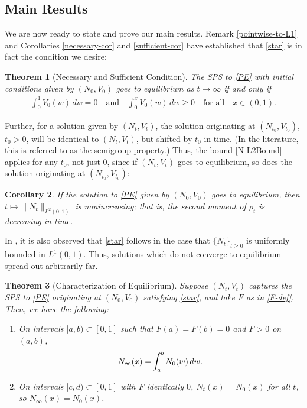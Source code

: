 \documentclass[11pt]{article}
\newtheorem{thm}{Theorem}[section]
\newtheorem{cor}[thm]{Corollary}
\numberwithin{equation}{section}
\def\Xint#1{\mathchoice
{\XXint\displaystyle\textstyle{#1}}%
{\XXint\textstyle\scriptstyle{#1}}%
{\XXint\scriptstyle\scriptscriptstyle{#1}}%
{\XXint\scriptscriptstyle\scriptscriptstyle{#1}}%
   \!\int}
\def\XXint#1#2#3{{\setbox0=\hbox{$#1{#2#3}{\int}$}
\vcenter{\hbox{$#2#3$}}\kern-.5\wd0}}
\def\dashint{\Xint-}
\begin{document}
\subsection{Main Results}
    We are now ready to state and prove our main results. Remark \ref{pointwise-to-L1} and Corollaries \ref{necessary-cor} and \ref{sufficient-cor} have established that \eqref{star} is in fact the condition we desire: 
    \begin{thm}[Necessary and Sufficient Condition]\label{necessary-and-sufficient}
        The SPS to \eqref{PE}  with initial conditions given by $(N_0, V_0)$ goes to equilibrium as $t\to\infty$ if and only if
        \begin{align*}\label{star2}\tag{$\bigstar$}
            \int_0^1 V_0(w) \, dw=0 \quad\text{and}\quad \int_0^x V_0(w) \, dw\geq0 \quad\text{for all}\quad x\in(0,1). 
        \end{align*}        
    \end{thm}
    Further, for a solution given by $(N_t,V_t)$, the solution originating at $(N_{t_0},V_{t_0})$, $t_0>0$, will be identical to $(N_t,V_t)$, but shifted by $t_0$ in time. (In the literature, this is referred to as the semigroup property.) Thus, the bound \eqref{N-L2Bound} applies for any $t_0$, not just $0$, since if $(N_t,V_t)$ goes to equilibrium, so does the solution originating at $(N_{t_0},V_{t_0})$:
    \begin{cor}
        If the solution to \eqref{PE} given by $(N_0,V_0)$ goes to equilibrium, then $t\mapsto\|N_t\|_{L^2(0,1)}$ is nonincreasing; that is, the second moment of $\rho_t$ is decreasing in time. 
    \end{cor}
    In \cite{Hynd-Tudorascu}, it is also observed that \eqref{star} follows in the case that $\{N_t\}_{t\geq0}$ is uniformly bounded in $L^1(0,1)$. Thus, solutions which do not converge to equilibrium spread out arbitrarily far. 

\begin{thm}[Characterization of Equilibrium]\label{characterization-of-equilibrium}
    Suppose $(N_t,V_t)$ captures the SPS to \eqref{PE} originating at $(N_0,V_0)$ satisfying \eqref{star}, and take $F$ as in \eqref{F-def}. Then, we have the following:
    \begin{enumerate}
        \item On intervals $[a,b)\subset[0,1]$ such that $F(a)=F(b)=0$ and $F>0$ on $(a,b)$, 
        \begin{align*}
            N_\infty(x)=\dashint_a^b N_0(w) \, dw. 
        \end{align*}
        \item On intervals $[c,d)\subset[0,1]$ with $F$ identically $0$, $N_t(x)=N_0(x)$ for all $t$, so $N_\infty(x)=N_0(x)$.
    \end{enumerate}
     
\end{thm}
\end{document}
